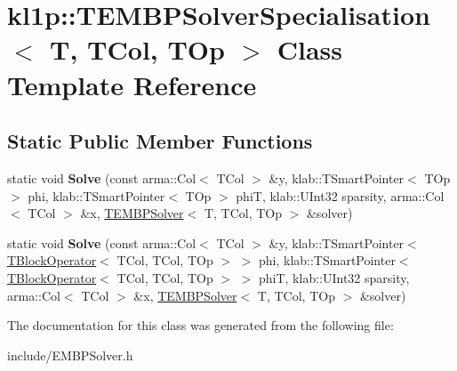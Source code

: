 \hypertarget{classkl1p_1_1TEMBPSolverSpecialisation}{}\section{kl1p\+:\+:T\+E\+M\+B\+P\+Solver\+Specialisation$<$ T, T\+Col, T\+Op $>$ Class Template Reference}
\label{classkl1p_1_1TEMBPSolverSpecialisation}
\subsection*{Static Public Member Functions}
\begin{DoxyCompactItemize}
\item 
static void {\bfseries Solve} (const arma\+::\+Col$<$ T\+Col $>$ \&y, klab\+::\+T\+Smart\+Pointer$<$ T\+Op $>$ phi, klab\+::\+T\+Smart\+Pointer$<$ T\+Op $>$ phiT, klab\+::\+U\+Int32 sparsity, arma\+::\+Col$<$ T\+Col $>$ \&x, \hyperlink{classkl1p_1_1TEMBPSolver}{T\+E\+M\+B\+P\+Solver}$<$ T, T\+Col, T\+Op $>$ \&solver)\hypertarget{classkl1p_1_1TEMBPSolverSpecialisation_adfb7b0d38e9e7d5cf07189089314e9a0}{}\label{classkl1p_1_1TEMBPSolverSpecialisation_adfb7b0d38e9e7d5cf07189089314e9a0}

\item 
static void {\bfseries Solve} (const arma\+::\+Col$<$ T\+Col $>$ \&y, klab\+::\+T\+Smart\+Pointer$<$ \hyperlink{classkl1p_1_1TBlockOperator}{T\+Block\+Operator}$<$ T\+Col, T\+Col, T\+Op $>$ $>$ phi, klab\+::\+T\+Smart\+Pointer$<$ \hyperlink{classkl1p_1_1TBlockOperator}{T\+Block\+Operator}$<$ T\+Col, T\+Col, T\+Op $>$ $>$ phiT, klab\+::\+U\+Int32 sparsity, arma\+::\+Col$<$ T\+Col $>$ \&x, \hyperlink{classkl1p_1_1TEMBPSolver}{T\+E\+M\+B\+P\+Solver}$<$ T, T\+Col, T\+Op $>$ \&solver)\hypertarget{classkl1p_1_1TEMBPSolverSpecialisation_a92521c0535fbe6ae449cfb9e7e9fa0ab}{}\label{classkl1p_1_1TEMBPSolverSpecialisation_a92521c0535fbe6ae449cfb9e7e9fa0ab}

\end{DoxyCompactItemize}


The documentation for this class was generated from the following file\+:\begin{DoxyCompactItemize}
\item 
include/E\+M\+B\+P\+Solver.\+h\end{DoxyCompactItemize}

